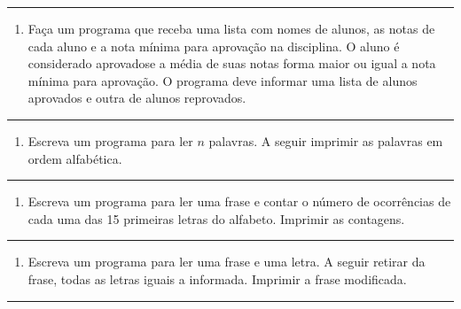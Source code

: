 \documentclass[12pt,a4paper]{article}
\renewcommand{\linethickness}{0.05em}
\providecommand{\tightlist}{%
      \setlength{\itemsep}{0pt}\setlength{\parskip}{0pt}}
\begin{document}
    \begin{center}\rule{0.5\linewidth}{\linethickness}\end{center}

\begin{enumerate}
\def\labelenumi{\arabic{enumi}.}
\setcounter{enumi}{20}
\tightlist
\item
  Faça um programa que receba uma lista com nomes de alunos, as notas de
  cada aluno e a nota mínima para aprovação na disciplina. O aluno é
  considerado aprovadose a média de suas notas forma maior ou igual a
  nota mínima para aprovação. O programa deve informar uma lista de
  alunos aprovados e outra de alunos reprovados.
\end{enumerate}

    \begin{center}\rule{0.5\linewidth}{\linethickness}\end{center}

\begin{enumerate}
\def\labelenumi{\arabic{enumi}.}
\setcounter{enumi}{21}
\tightlist
\item
  Escreva um programa para ler \(n\) palavras. A seguir imprimir as
  palavras em ordem alfabética.
\end{enumerate}

    \begin{center}\rule{0.5\linewidth}{\linethickness}\end{center}

\begin{enumerate}
\def\labelenumi{\arabic{enumi}.}
\setcounter{enumi}{22}
\tightlist
\item
  Escreva um programa para ler uma frase e contar o número de
  ocorrências de cada uma das 15 primeiras letras do alfabeto. Imprimir
  as contagens.
\end{enumerate}

    \begin{center}\rule{0.5\linewidth}{\linethickness}\end{center}

\begin{enumerate}
\def\labelenumi{\arabic{enumi}.}
\setcounter{enumi}{23}
\tightlist
\item
  Escreva um programa para ler uma frase e uma letra. A seguir retirar
  da frase, todas as letras iguais a informada. Imprimir a frase
  modificada.
\end{enumerate}

    \begin{center}\rule{0.5\linewidth}{\linethickness}\end{center}
\end{document}
